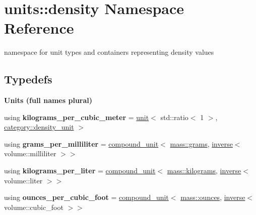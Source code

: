 \hypertarget{namespaceunits_1_1density}{}\section{units\+:\+:density Namespace Reference}
\label{namespaceunits_1_1density}


namespace for unit types and containers representing density values  


\subsection*{Typedefs}
\begin{Indent}{\bf Units (full names plural)}\par
\begin{DoxyCompactItemize}
\item 
\hypertarget{namespaceunits_1_1density_aefc107716078df2f8fe8f651f11d1866}{}using {\bfseries kilograms\+\_\+per\+\_\+cubic\+\_\+meter} = \hyperlink{structunits_1_1unit}{unit}$<$ std\+::ratio$<$ 1 $>$, \hyperlink{namespaceunits_1_1category_aa338785548e6227b8cf75db73e25e276}{category\+::density\+\_\+unit} $>$\label{namespaceunits_1_1density_aefc107716078df2f8fe8f651f11d1866}

\item 
\hypertarget{namespaceunits_1_1density_af223051bfd037eeeea44aab95ff5e48a}{}using {\bfseries grams\+\_\+per\+\_\+milliliter} = \hyperlink{group___unit_types_ga9c3f6f077dc894620e1ed8358442a8f1}{compound\+\_\+unit}$<$ \hyperlink{structunits_1_1unit}{mass\+::grams}, \hyperlink{group___unit_manipulators_gaacc539ef162e24b260d023d3ff949b57}{inverse}$<$ volume\+::milliliter $>$$>$\label{namespaceunits_1_1density_af223051bfd037eeeea44aab95ff5e48a}

\item 
\hypertarget{namespaceunits_1_1density_a39cfa40a031812a36599aa32675ea385}{}using {\bfseries kilograms\+\_\+per\+\_\+liter} = \hyperlink{group___unit_types_ga9c3f6f077dc894620e1ed8358442a8f1}{compound\+\_\+unit}$<$ \hyperlink{structunits_1_1unit}{mass\+::kilograms}, \hyperlink{group___unit_manipulators_gaacc539ef162e24b260d023d3ff949b57}{inverse}$<$ volume\+::liter $>$$>$\label{namespaceunits_1_1density_a39cfa40a031812a36599aa32675ea385}

\item 
\hypertarget{namespaceunits_1_1density_adc5ed5fd6a83ed4a29d9c6b26a49d351}{}using {\bfseries ounces\+\_\+per\+\_\+cubic\+\_\+foot} = \hyperlink{group___unit_types_ga9c3f6f077dc894620e1ed8358442a8f1}{compound\+\_\+unit}$<$ \hyperlink{structunits_1_1unit}{mass\+::ounces}, \hyperlink{group___unit_manipulators_gaacc539ef162e24b260d023d3ff949b57}{inverse}$<$ volume\+::cubic\+\_\+foot $>$$>$\label{namespaceunits_1_1density_adc5ed5fd6a83ed4a29d9c6b26a49d351}


\end{DoxyCompactItemize}
\end{Indent}
